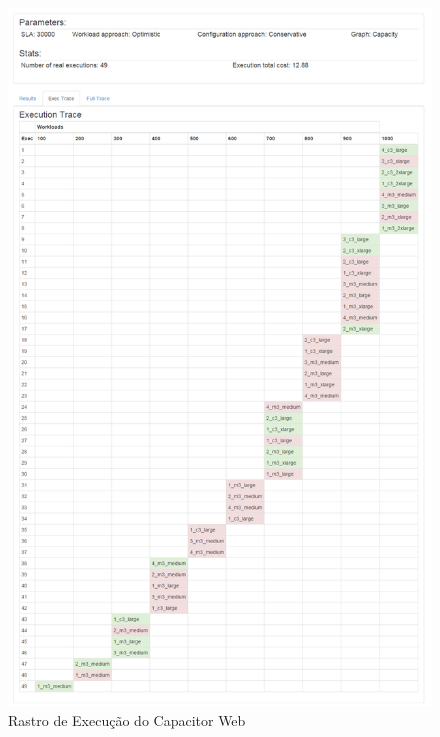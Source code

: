 \begin{figure}[htb]
  \caption{\label{fig:capacitor_web_results}Rastro de Execução do Capacitor Web}
  \begin{center}
    \includegraphics[scale=0.45]{img/CapacitorWeb_ExecutionTrace}
  \end{center}
\end{figure}

